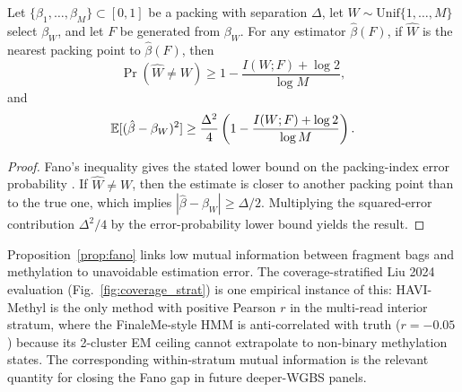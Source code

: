 \begin{proposition}
\label{prop:fano}
Let $\{\beta_1,\dots,\beta_M\}\subset[0,1]$ be a packing with separation $\Delta$, let $W\sim\mathrm{Unif}\{1,\dots,M\}$ select $\beta_W$, and let $F$ be generated from $\beta_W$. For any estimator $\hat\beta(F)$, if $\hat W$ is the nearest packing point to $\hat\beta(F)$, then
\[
\Pr(\hat W\ne W) \ge 1 - \frac{I(W;F)+\log 2}{\log M},
\]
and
\[
\mathbb{E}[(\hat\beta-\beta_W)^2]\ge \frac{\Delta^2}{4}\left(1 - \frac{I(W;F)+\log 2}{\log M}\right).
\]
\end{proposition}
\begin{proof}
Fano's inequality gives the stated lower bound on the packing-index error probability \citep{cover2006information}. If $\hat W\ne W$, then the estimate is closer to another packing point than to the true one, which implies $|\hat\beta-\beta_W|\ge \Delta/2$. Multiplying the squared-error contribution $\Delta^2/4$ by the error-probability lower bound yields the result.
\end{proof}

\begin{remark}
Proposition~\ref{prop:fano} links low mutual information between fragment bags and methylation to unavoidable estimation error. The coverage-stratified Liu 2024 evaluation (Fig.~\ref{fig:coverage_strat}) is one empirical instance of this: HAVI-Methyl is the only method with positive Pearson $r$ in the multi-read interior stratum, where the FinaleMe-style HMM is anti-correlated with truth ($r=-0.05$) because its 2-cluster EM ceiling cannot extrapolate to non-binary methylation states. The corresponding within-stratum mutual information is the relevant quantity for closing the Fano gap in future deeper-WGBS panels.
\end{remark}

